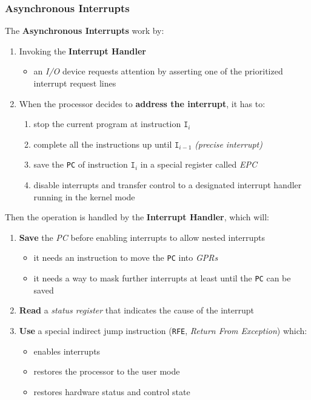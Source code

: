 \documentclass[english]{article}
\begin{document}
\subsubsection{Asynchronous Interrupts}

The \textbf{Asynchronous Interrupts} work by:

\begin{enumerate}
  \item Invoking the \textbf{Interrupt Handler}
        \begin{itemize}
          \item an \textit{I/O} device requests attention by asserting one of the prioritized interrupt request lines
        \end{itemize}
  \item When the processor decides to \textbf{address the interrupt}, it has to:
        \begin{enumerate}[label=\arabic*.]
          \item stop the current program at instruction \(\texttt{I}_i\)
          \item complete all the instructions up until \(\texttt{I}_{i-1}\) \textit{(precise interrupt)}
          \item save the \texttt{PC} of instruction \(\texttt{I}_i\) in a special register called \textit{EPC}
          \item disable interrupts and transfer control to a designated interrupt handler running in the kernel mode
        \end{enumerate}
\end{enumerate}

Then the operation is handled by the \textbf{Interrupt Handler}, which will:

\begin{enumerate}[resume*]
  \item \textbf{Save} the \textit{PC} before enabling interrupts to allow nested interrupts
        \begin{itemize}
          \item it needs an instruction to move the \texttt{PC} into \textit{GPRs}
          \item it needs a way to mask further interrupts at least until the \texttt{PC} can be saved
        \end{itemize}
  \item \textbf{Read} a \textit{status register} that indicates the cause of the interrupt
  \item \textbf{Use} a special indirect jump instruction (\texttt{RFE}, \textit{Return From Exception}) which:
        \begin{itemize}
          \item enables interrupts
          \item restores the processor to the user mode
          \item restores hardware status and control state
        \end{itemize}
\end{enumerate}
\end{document}
